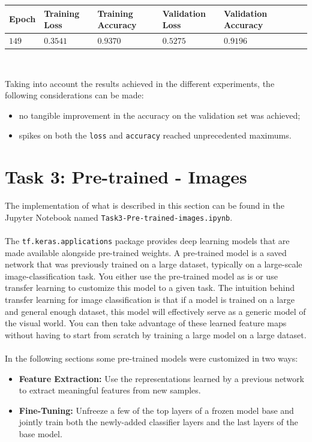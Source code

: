 \documentclass[11pt,a4paper]{article}
\begin{document}
\begin{center}
\hspace*{-0.8cm}
\begin{tabular}{|p{1.2cm}|p{1.8cm}|p{2cm}|p{2cm}|p{2cm}|p{2cm}|p{2cm}|}
\rowcolor{gray!50}
\hline
\textbf{Epoch} & \textbf{Training Loss} & \textbf{Training Accuracy} & \textbf{Validation Loss} & \textbf{Validation Accuracy}\\
\hline
$149$ & $0.3541$ & $0.9370$ & $0.5275$ & $0.9196$\\
\hline
\end{tabular}\\
\end{center}
Taking into account the results achieved in the different experiments, the following considerations can be made:
\begin{itemize}
    \item no tangible improvement in the accuracy on the validation set was achieved;
    \item spikes on both the \texttt{loss} and \texttt{accuracy} reached unprecedented maximums.
\end{itemize}

\newpage
\section{Task 3: Pre-trained - Images}
The implementation of what is described in this section can be found in the Jupyter Notebook named \texttt{Task3-Pre-trained-images.ipynb}.\\
\\
The \texttt{tf.keras.applications} package provides deep learning models that are made available alongside pre-trained weights. A pre-trained model is a saved network that was previously trained on a large dataset, typically on a large-scale image-classification task. You either use the pre-trained model as is or use transfer learning to customize this model to a given task. The intuition behind transfer learning for image classification is that if a model is trained on a large and general enough dataset, this model will effectively serve as a generic model of the visual world. You can then take advantage of these learned feature maps without having to start from scratch by training a large model on a large dataset.\\
\\
In the following sections some pre-trained models were customized in two ways:
\begin{itemize}
    \item \textbf{Feature Extraction:} Use the representations learned by a previous network to extract meaningful features from new samples.
    \item \textbf{Fine-Tuning:} Unfreeze a few of the top layers of a frozen model base and jointly train both the newly-added classifier layers and the last layers of the base model.
\end{itemize}
\end{document}
